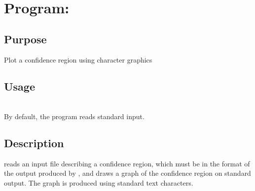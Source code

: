 \chapter{Program: \label{ch.ci2txt}}

\section{Purpose} Plot a confidence region using character graphics

\section{Usage\label{sec.ci2txt.usage}} \\
By default, the program reads standard input.

\section{Description}

 reads an input file describing a confidence region, which
must be in the format of the output produced by , and draws a
graph of the confidence region on standard output.  The graph is
produced using standard text characters.

